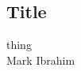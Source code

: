 \documentclass[a4paper, 12pt]{article}
\title{}
\date{}
\begin{document}
\begin{center}
\section*{Title}
thing\\
Mark Ibrahim \\
\end{center}

\end{document}
